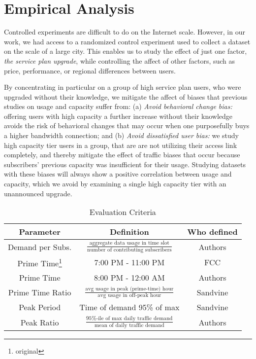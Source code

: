\section{Empirical Analysis}\label{sec:analysis}


Controlled experiments are difficult to do on the Internet scale. However, in 
our work, we had access to a randomized control experiment used to collect a 
dataset on the scale of a large city. This enables us to study the effect of 
just one factor, \emph{the service plan upgrade}, while controlling the affect 
of other factors, such as price, performance, or regional differences between 
users.

By concentrating in particular on a group of high service plan users, who were 
upgraded without their knowledge, we mitigate the affect of biases that 
previous studies on usage and capacity suffer from: (a) \emph{Avoid behavioral 
change bias:} offering users with high capacity a further increase without 
their knowledge avoids the risk of behavioral changes that may occur when one 
purposefully buys a higher bandwidth connection; and (b) \emph{Avoid 
dissatisfied user bias:} we study high capacity tier users in a \control{} 
group, that are are not utilizing their access link completely, and thereby 
mitigate the effect of traffic biases that occur because subscribers' previous 
capacity was insufficient for their usage. Studying datasets with these biases 
will always show a positive correlation between usage and capacity, which we 
avoid by examining a single high capacity tier with an unannounced upgrade.

\begin{table}[ht]
\small 
\begin{tabular}{c|c|c}\hline
\textbf{Parameter} & \textbf{Definition} & \textbf{Who defined}		\\\hline
Demand per Subs.& \(\frac{\text{aggregate data usage in 
time slot}}{\text{number of contributing subscribers}}\) & Authors 	\\
Prime Time\footnote{original}	& 7:00 PM - 11:00 PM		& FCC	\\
Prime Time		& 8:00 PM - 12:00 AM   		& Authors	\\
Prime Time Ratio 	& \( \frac{ \text{avg usage in peak (prime-time) 
hour}}{ \text{avg usage in off-peak hour}}\) 		& Sandvine	\\
Peak Period		& Time of demand 95\% of max    & Sandvine	\\
Peak Ratio 		& \(\frac{\text{95\%-ile of max daily 
traffic demand}}{\text{mean of daily traffic demand}}\)	& Authors 	\\\hline
\end{tabular}
\caption{Evaluation Criteria}
\label{tab:eval-criteria}
\end{table}


